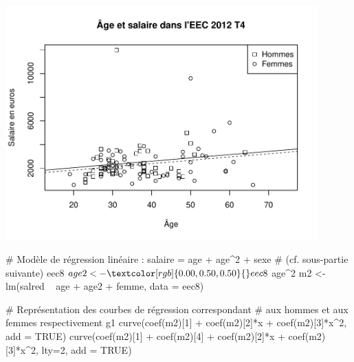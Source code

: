 \documentclass[12pt,twosided, notitlepage]{book}
\newenvironment{Shaded}{}{}
\newcommand{\CommentTok}[1]{\textcolor[rgb]{0.00,0.50,0.00}{#1}}
\newcommand{\DataTypeTok}[1]{#1}
\newcommand{\DecValTok}[1]{#1}
\newcommand{\KeywordTok}[1]{\textcolor[rgb]{0.00,0.00,1.00}{#1}}
\newcommand{\NormalTok}[1]{#1}
\newcommand{\OperatorTok}[1]{#1}
\newcommand{\OtherTok}[1]{\textcolor[rgb]{1.00,0.25,0.00}{#1}}
\newcommand{\StringTok}[1]{\textcolor[rgb]{0.00,0.50,0.50}{#1}}
\renewenvironment{Shaded}{\begin{snugshade}}{\end{snugshade}}
\begin{document}
\begin{center}\includegraphics[width=12cm]{livret_files/figure-latex/unnamed-chunk-439-1} \end{center}

\begin{Shaded}
\begin{Highlighting}[]
\CommentTok{# Modèle de régression linéaire : salaire = age + age^2 + sexe}
\CommentTok{# (cf. sous-partie suivante)}
\NormalTok{eec8}\OperatorTok{$}\NormalTok{age2 <-}\StringTok{ }\NormalTok{eec8}\OperatorTok{$}\NormalTok{age}\OperatorTok{^}\DecValTok{2}
\NormalTok{m2 <-}\StringTok{ }\KeywordTok{lm}\NormalTok{(salred }\OperatorTok{~}\StringTok{ }\NormalTok{age }\OperatorTok{+}\StringTok{ }\NormalTok{age2 }\OperatorTok{+}\StringTok{ }\NormalTok{femme, }\DataTypeTok{data =}\NormalTok{ eec8)}

\CommentTok{# Représentation des courbes de régression correspondant}
\CommentTok{# aux hommes et aux femmes respectivement}
\NormalTok{g1}
\KeywordTok{curve}\NormalTok{(}\KeywordTok{coef}\NormalTok{(m2)[}\DecValTok{1}\NormalTok{] }\OperatorTok{+}\StringTok{ }\KeywordTok{coef}\NormalTok{(m2)[}\DecValTok{2}\NormalTok{]}\OperatorTok{*}\NormalTok{x }\OperatorTok{+}\StringTok{ }\KeywordTok{coef}\NormalTok{(m2)[}\DecValTok{3}\NormalTok{]}\OperatorTok{*}\NormalTok{x}\OperatorTok{^}\DecValTok{2}\NormalTok{, }\DataTypeTok{add =} \OtherTok{TRUE}\NormalTok{)}
\KeywordTok{curve}\NormalTok{(}\KeywordTok{coef}\NormalTok{(m2)[}\DecValTok{1}\NormalTok{] }\OperatorTok{+}\StringTok{ }\KeywordTok{coef}\NormalTok{(m2)[}\DecValTok{4}\NormalTok{] }\OperatorTok{+}\StringTok{ }\KeywordTok{coef}\NormalTok{(m2)[}\DecValTok{2}\NormalTok{]}\OperatorTok{*}\NormalTok{x }\OperatorTok{+}\StringTok{ }\KeywordTok{coef}\NormalTok{(m2)[}\DecValTok{3}\NormalTok{]}\OperatorTok{*}\NormalTok{x}\OperatorTok{^}\DecValTok{2}\NormalTok{, }\DataTypeTok{lty=}\DecValTok{2}\NormalTok{, }\DataTypeTok{add =} \OtherTok{TRUE}\NormalTok{)}
\end{Highlighting}
\end{Shaded}
\end{document}
